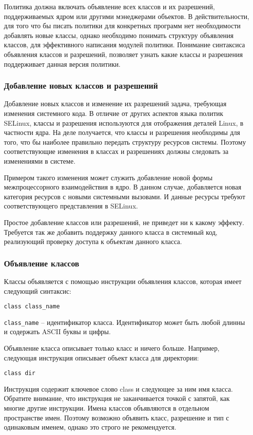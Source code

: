\documentclass{./../class/UIR}
\begin{document}
	Политика должна включать объявление всех классов и их разрешений,
	поддерживаемых ядром или другими мэнеджерами объектов. В действительности, для
	того что бы писать политики для конкретных программ нет необходимости
	добавлять новые классы, однако необходимо понимать структуру объявления
	классов, для эффективного написания модулей политики. Понимание синтаксиса
	объявления классов и разрешений, позволяет узнать какие классы и разрешения
	поддерживает данная версия политики.

\subsubsection{Добавление новых классов и разрешений}
    Добавление новых классов и изменение их разрешений задача, требующая
    изменения системного кода. В отличие от других аспектов языка политик
    SELinux, классы и разрешения используются для отображения деталей Linux, в
    частности ядра. На деле получается, что классы и разрешения необходимы для
    того, что бы наиболее правильно передать структуру ресурсов системы. Поэтому
    соответствующие изменения в классах и разрешениях должны следовать за
    изменениями в системе.

    Примером такого изменения может служить добавление новой формы межпроцессорного
    взаимодействия в ядро. В данном случае,  добавляется новая категория ресурсов с
    новыми системными вызовами. И данные ресурсы требуют соответствующего
    представления в SELinux.

    Простое добавление классов или разрешений, не приведет ни к какому эффекту.
    Требуется так же добавить поддержку данного класса в системный код, реализующий
    проверку доступа к объектам данного класса.

\subsubsection{Объявление классов}
    Классы объявляется с помощью инструкции объявления классов, которая имеет
    следующий синтаксис:

\verb"class class_name"

    \verb"class_name" – идентификатор класса. Идентификатор может быть
    любой длинны и содержать ASCII буквы и цифры.

    Объявление класса описывает только класс и ничего больше. Например, следующая
    инструкция описывает объект класса для директории:
\begin{verbatim}
class dir
\end{verbatim}
    Инструкция содержит ключевое слово class и следующее за ним имя
    класса. Обратите внимание, что инструкция не заканчивается точкой с запятой, как
    многие другие инструкции. Имена классов объявляются в отдельном пространстве
    имен. Поэтому возможно объявить класс, разрешение и тип с одинаковым именем,
    однако это строго не рекомендуется.
\end{document}

